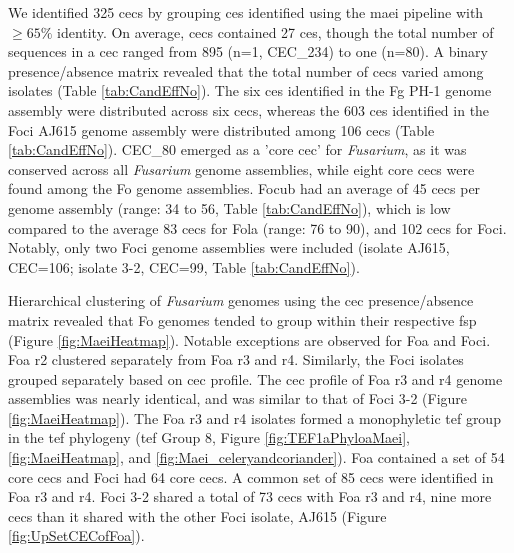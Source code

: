 We identified 325 \acfp{cec} by grouping \acp{ce} identified using the \ac{maei} pipeline with $\ge65\%$ identity. On average, \acp{cec} contained 27 \acp{ce}, though the total number of sequences in a \ac{cec} ranged from 895 (n=1, CEC\_234) to one (n=80). A binary presence/absence matrix revealed that the total number of \acp{cec} varied among isolates (Table \ref{tab:CandEffNo}). The six \acp{ce} identified in the \ac{Fg} PH-1 genome assembly were distributed across six \acp{cec}, whereas the 603 \acp{ce} identified in the \ac{Foci} AJ615 genome assembly were distributed among 106 \acp{cec} (Table \ref{tab:CandEffNo}). CEC\_80 emerged as a 'core \ac{cec}' for \textit{Fusarium}, as it was conserved across all \textit{Fusarium} genome assemblies, while eight core \acp{cec} were found among the \ac{Fo} genome assemblies. \ac{Focub} had an average of 45 \acp{cec} per genome assembly (range: 34 to 56, Table \ref{tab:CandEffNo}), which is low compared to the average 83 \acp{cec} for \ac{Fola} (range: 76 to 90), and 102 \acp{cec} for \ac{Foci}. Notably, only two \ac{Foci} genome assemblies were included (isolate AJ615, CEC=106; isolate 3-2, CEC=99, Table \ref{tab:CandEffNo}). 

Hierarchical clustering of \textit{Fusarium} genomes using the  \ac{cec} presence/absence matrix revealed that \ac{Fo} genomes tended to group within their respective \ac{fsp} (Figure \ref{fig:MaeiHeatmap}). Notable exceptions are observed for \ac{Foa} and \ac{Foci}. \ac{Foa} \ac{r2} clustered separately from \ac{Foa} \ac{r3} and \ac{r4}. Similarly, the \ac{Foci} isolates grouped separately based on \ac{cec} profile. The \ac{cec} profile of \ac{Foa} \ac{r3} and \ac{r4} genome assemblies was nearly identical, and was similar to that of \ac{Foci} 3-2 (Figure \ref{fig:MaeiHeatmap}). The \ac{Foa} \ac{r3} and \ac{r4} isolates formed a monophyletic \ac{tef} group in the \ac{tef} phylogeny (\ac{tef} Group 8, Figure \ref{fig:TEF1aPhyloaMaei}, \ref{fig:MaeiHeatmap}, and \ref{fig:Maei_celeryandcoriander}). \ac{Foa} contained a set of 54 core \acp{cec} and \ac{Foci} had 64 core \acp{cec}. A common set of 85 \acp{cec} were identified in \ac{Foa} \ac{r3} and \ac{r4}. \ac{Foci} 3-2 shared a total of 73 \acp{cec} with \ac{Foa} \ac{r3} and \ac{r4}, nine more \acp{cec} than it shared with the other \ac{Foci} isolate, AJ615 (Figure \ref{fig:UpSetCECofFoa}). 

